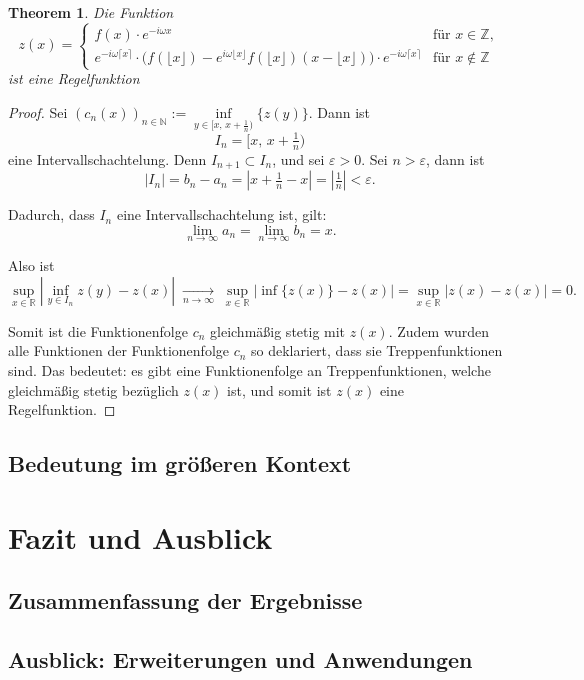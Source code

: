 \documentclass[a4paper,12pt]{article}
\newtheorem{theorem}{Theorem}[section]
\theoremstyle{definition}
\theoremstyle{remark}
\begin{document}
\begin{theorem}
Die Funktion 
\[
z(x) =
\begin{cases}
f(x)\cdot e^{-i\omega x} & \text{für } x \in \mathbb{Z}, \\[6pt]
e^{-i\omega \lceil x\rceil} \cdot \bigl( f(\lfloor x \rfloor) - e^{i\omega \lfloor x \rfloor} f(\lfloor x \rfloor)(x - \lfloor x \rfloor) \bigr) \cdot e^{-i\omega \lceil x\rceil} & \text{für } x \notin \mathbb{Z}
\end{cases}
\]
ist eine Regelfunktion
\end{theorem}
\begin{proof}
Sei \((c_n(x))_{n \in \mathbb{N}} := \underset{y \in \bigl[x,\, x + \tfrac{1}{n}\bigr)}{\inf} \{z(y)\}\).
Dann ist 
\[
I_n = \bigl[ x,\, x + \tfrac{1}{n} \bigr)
\]
eine Intervallschachtelung. Denn \( I_{n+1} \subset I_n \), und sei \(\varepsilon > 0\).  
Sei \( n > \varepsilon \), dann ist
\[
|I_n| = b_n - a_n = \left| x + \tfrac{1}{n} - x \right| = \left| \tfrac{1}{n} \right| < \varepsilon.
\]

Dadurch, dass \( I_n \) eine Intervallschachtelung ist, gilt:
\[
\lim_{n \to \infty} a_n = \lim_{n \to \infty} b_n = x.
\]

Also ist
\[
\sup_{x \in \mathbb{R}} \left| \inf_{y \in I_n} z(y) - z(x) \right| 
\;\xrightarrow[n \to \infty]{}\;
\sup_{x \in \mathbb{R}} \left| \inf \{z(x)\}- z(x) \right|
= \sup_{x \in \mathbb{R}} \left| z(x) - z(x) \right| 
= 0.
\]

\medskip

Somit ist die Funktionenfolge \(c_n\) gleichmäßig stetig mit \(z(x)\).  
Zudem wurden alle Funktionen der Funktionenfolge \(c_n\) so deklariert, 
dass sie Treppenfunktionen sind. Das bedeutet: es gibt eine Funktionenfolge an 
Treppenfunktionen, welche gleichmäßig stetig bezüglich \(z(x)\) ist, und somit 
ist \(z(x)\) eine Regelfunktion.

\end{proof}

\subsection{Bedeutung im größeren Kontext}
        

                
                
\section{Fazit und Ausblick}
\subsection{Zusammenfassung der Ergebnisse}
\subsection{Ausblick: Erweiterungen und Anwendungen}
                
\end{document}
